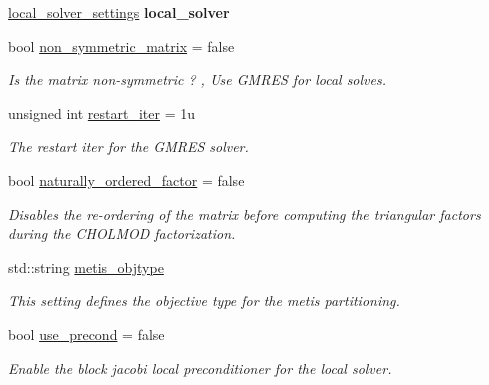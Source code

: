 \begin{DoxyCompactItemize}
\hyperlink{structschwz_1_1Settings_a31e82310ef6aed08168baef78f0db69e}{local\+\_\+solver\+\_\+settings} {\bfseries local\+\_\+solver}
\item 
\mbox{\label{structschwz_1_1Settings_a5f110676f929eebeb357cb07398e2048}} 
bool \hyperlink{structschwz_1_1Settings_a5f110676f929eebeb357cb07398e2048}{non\+\_\+symmetric\+\_\+matrix} = false
\begin{DoxyCompactList}\small\item\em Is the matrix non-\/symmetric ? , Use G\+M\+R\+ES for local solves. \end{DoxyCompactList}\item 
\mbox{\label{structschwz_1_1Settings_a7d26302ccb58fd96c795046ecc577694}} 
unsigned int \hyperlink{structschwz_1_1Settings_a7d26302ccb58fd96c795046ecc577694}{restart\+\_\+iter} = 1u
\begin{DoxyCompactList}\small\item\em The restart iter for the G\+M\+R\+ES solver. \end{DoxyCompactList}\item 
bool \hyperlink{structschwz_1_1Settings_a75a2ff3778c7334382a6c74553dbd5b4}{naturally\+\_\+ordered\+\_\+factor} = false
\begin{DoxyCompactList}\small\item\em Disables the re-\/ordering of the matrix before computing the triangular factors during the C\+H\+O\+L\+M\+OD factorization. \end{DoxyCompactList}\item 
\mbox{\label{structschwz_1_1Settings_a8a057e4ac5331c9222ad539ffd1f5c3d}} 
std\+::string \hyperlink{structschwz_1_1Settings_a8a057e4ac5331c9222ad539ffd1f5c3d}{metis\+\_\+objtype}
\begin{DoxyCompactList}\small\item\em This setting defines the objective type for the metis partitioning. \end{DoxyCompactList}\item 
\mbox{\label{structschwz_1_1Settings_ab51cf8eda75e05280084e89895121ca7}} 
bool \hyperlink{structschwz_1_1Settings_ab51cf8eda75e05280084e89895121ca7}{use\+\_\+precond} = false
\begin{DoxyCompactList}\small\item\em Enable the block jacobi local preconditioner for the local solver. \end{DoxyCompactList}\item 

\end{DoxyCompactItemize}
